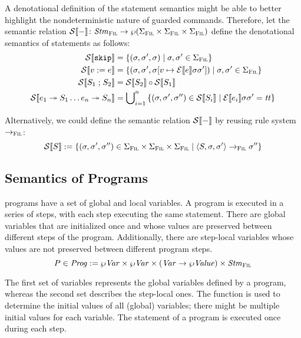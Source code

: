 \documentclass[a4paper,10pt,english]{article}
\begin{document}
A denotational definition of the statement semantics might be able to better highlight the nondeterministic nature of guarded
commands. Therefore, let the semantic relation $\mathcal{S} \llbracket - \rrbracket \colon \mathit{Stm}_\textsc{Fil} \rightarrow \wp (\Sigma_\textsc{Fil} \times \Sigma_\textsc{Fil} \times
\Sigma_\textsc{Fil})$ define the denotational semantics of statements as follows:
\begin{align*}
	\mathcal{S} \llbracket \mathtt{skip} \rrbracket &= \{ (\sigma, \sigma', \sigma) \mid \sigma, \sigma' \in \Sigma_\textsc{Fil} \}
	\\
	\mathcal{S} \llbracket v\; \mathtt{:=}\; e \rrbracket &= \{ (\sigma, \sigma', \sigma[v \mapsto \mathcal{E} \llbracket e \rrbracket \sigma
	\sigma']) \mid \sigma, \sigma' \in \Sigma_\textsc{Fil} \}
	\\
	\mathcal{S} \llbracket S_1 \; \mathtt{;} \; S_2 \rrbracket &= \mathcal{S} \llbracket S_2 \rrbracket \circ \mathcal{S} \llbracket S_1 \rrbracket
	\\
	\mathcal{S} \llbracket e_1 \; \mathtt{\twoheadrightarrow} \; S_1 \ldots e_n \; \mathtt{\twoheadrightarrow} \; S_n \rrbracket &= 
		\bigcup\nolimits_{i = 1}^n \,
		\{ (\sigma, \sigma', \sigma'') \in \mathcal{S} \llbracket S_i \rrbracket \mid \mathcal{E} \llbracket e_i \rrbracket \sigma \sigma' = \mathit{tt} \}
\end{align*}

Alternatively, we could define the semantic relation $\mathcal{S} \llbracket - \rrbracket$ by reusing rule system $\rightarrow_{\textsc{Fil}}$:
\begin{equation*}
	\mathcal{S} \llbracket S \rrbracket := \{ (\sigma, \sigma', \sigma'') \in \Sigma_\textsc{Fil} \times \Sigma_\textsc{Fil} \times \Sigma_\textsc{Fil} \mid
	\langle S, \sigma, \sigma' \rangle \rightarrow_{\textsc{Fil}} \sigma'' \}
\end{equation*}

\subsection{Semantics of \Fil Programs}

\Fil programs have a set of global and local variables. A \Fil program is executed in a series of steps, with each step executing
the same statement. There are global variables that are initialized once and whose values are preserved between
different steps of the program. Additionally, there are step-local variables whose values are not preserved between different
program steps.
\begin{equation*}
	P \in \mathit{Prog} := \wp \mathit{Var} \times \wp \mathit{Var} \times (\mathit{Var} \rightarrow \wp \mathit{Value}) \times \mathit{Stm}_\textsc{Fil}
\end{equation*}

The first set of variables represents the global variables defined by a program, whereas the second set describes the step-local
ones. The function is used to determine the initial values of all (global) variables; there might be multiple initial
values for each variable. The statement of a program is executed once during each step.
\end{document}
